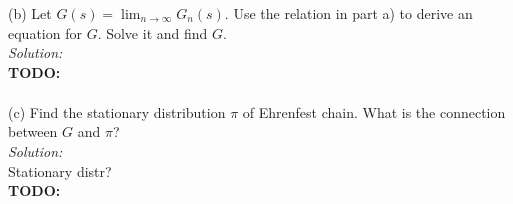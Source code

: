 \documentclass[10pt]{amsart}
\begin{document}
\noindent
(b) Let $G(s)= \lim_{n \to \infty}  G_n(s)$. Use the relation in part a) to derive an equation for $G$. Solve it and find $G$. \\

\noindent
\textit{Solution:} \\
\textbf{TODO:} \\
\begin{align*}
\end{align*}

\noindent
(c) Find the stationary distribution $\pi$ of Ehrenfest chain. What is the connection between $G$ and $\pi$? \\

\noindent
\textit{Solution:} \\
Stationary distr? \\
\textbf{TODO:} \\
\begin{align*}
\end{align*}

\newpage
\end{document}
